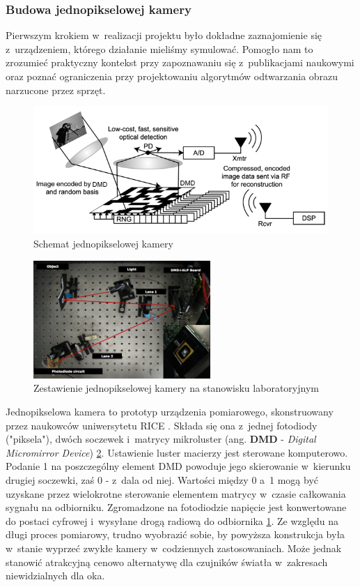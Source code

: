 \subsubsection{Budowa jednopikselowej kamery}
Pierwszym krokiem w~realizacji projektu było dokładne zaznajomienie się z~urządzeniem, którego działanie mieliśmy symulować. Pomogło nam to zrozumieć praktyczny kontekst przy zapoznawaniu się z~publikacjami naukowymi oraz poznać ograniczenia przy projektowaniu algorytmów odtwarzania obrazu narzucone przez sprzęt.

\begin{figure}
\centering
	\includegraphics[width=\textwidth]{rysunki/cscam.png}
\caption{Schemat jednopikselowej kamery}
\label{fig:singlePixelSchema}
\end{figure}

\begin{figure}
\centering
	\includegraphics[width=0.6\textwidth]{rysunki/cscamerasetup.jpg}
\caption{Zestawienie jednopikselowej kamery na stanowisku laboratoryjnym}
\label{fig:singlePixelSetup}
\end{figure}

Jednopikselowa kamera to prototyp urządzenia pomiarowego, skonstruowany przez naukowców uniwersytetu RICE \cite{SinglePixelCamera}. Składa się ona z~jednej fotodiody ("piksela"), dwóch soczewek i~matrycy mikroluster (ang. \textbf{DMD} - \textit{Digital Micromirror Device}) \ref{fig:singlePixelSetup}. Ustawienie luster macierzy jest sterowane komputerowo. Podanie 1 na poszczególny element DMD powoduje jego skierowanie w~kierunku drugiej soczewki, zaś 0 - z~dala od niej. Wartości między 0 a~1 mogą być uzyskane przez wielokrotne sterowanie elementem matrycy w~czasie całkowania sygnału na odbiorniku. Zgromadzone na fotodiodzie napięcie jest konwertowane do postaci cyfrowej i~wysyłane drogą radiową do odbiornika \ref{fig:singlePixelSchema}. Ze względu na długi proces pomiarowy, trudno wyobrazić sobie, by powyższa konstrukcja była w~stanie wyprzeć zwykłe kamery w~codziennych zastosowaniach. Może jednak stanowić atrakcyjną cenowo alternatywę dla czujników światła w~zakresach niewidzialnych dla oka.

